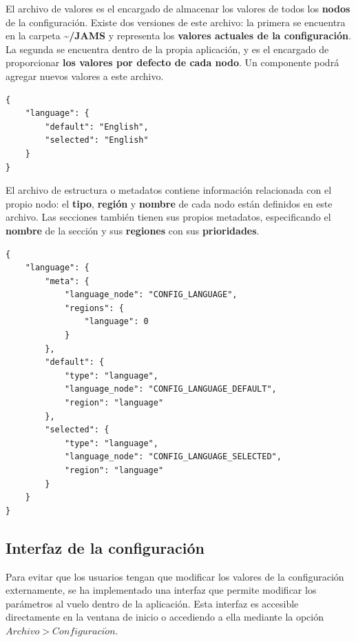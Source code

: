 El archivo de valores es el encargado de almacenar los valores de
todos los \textbf{nodos} de la configuración.
Existe dos versiones de este archivo:
la primera se encuentra en la carpeta \textbf{\textasciitilde/JAMS} y representa los \textbf{valores
actuales de la configuración}.
La segunda se encuentra dentro de la propia aplicación, y es el encargado de
proporcionar \textbf{los valores por defecto de cada nodo}.
Un componente podrá agregar nuevos valores a este archivo.

\begin{lstlisting}[frame=single,label={lst:main_config.json}]
{
    "language": {
        "default": "English",
        "selected": "English"
    }
}
\end{lstlisting}

El archivo de estructura o metadatos contiene información
relacionada con el propio nodo: el \textbf{tipo}, \textbf{región}
y \textbf{nombre} de cada nodo están definidos en este archivo.
Las secciones también tienen sus propios metadatos, especificando
el \textbf{nombre} de la sección y sus \textbf{regiones} con sus
\textbf{prioridades}.

\begin{lstlisting}[frame=single,label={lst:main_config_meta.json}]
{
    "language": {
        "meta": {
            "language_node": "CONFIG_LANGUAGE",
            "regions": {
                "language": 0
            }
        },
        "default": {
            "type": "language",
            "language_node": "CONFIG_LANGUAGE_DEFAULT",
            "region": "language"
        },
        "selected": {
            "type": "language",
            "language_node": "CONFIG_LANGUAGE_SELECTED",
            "region": "language"
        }
    }
}
\end{lstlisting}

\subsection{Interfaz de la configuración}\label{subsec:interfaz-de-la-configuración}

Para evitar que los usuarios tengan que modificar los valores de la configuración
externamente, se ha implementado una interfaz que permite modificar los
parámetros al vuelo dentro de la aplicación.
Esta interfaz es accesible directamente en la ventana de inicio o accediendo a ella
mediante la opción $Archivo > Configuraci\acute on$.

